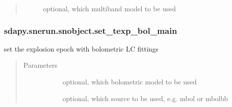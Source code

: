 \documentclass[letterpaper,10pt,english]{sphinxmanual}
\begin{document}
\begin{fulllineitems}
\begin{fulllineitems}
\begin{quote}
\begin{description}
\begin{description}
\item[{}] \leavevmode{[}\sphinxtitleref{str}{]}
optional, which multiband model to be used

\end{description}

\end{description}\end{quote}

\end{fulllineitems}



\subsubsection{sdapy.snerun.snobject.set\_texp\_bol\_main}
\label{\detokenize{generated/sdapy.snerun.snobject.set_texp_bol_main:sdapy-snerun-snobject-set-texp-bol-main}}\label{\detokenize{generated/sdapy.snerun.snobject.set_texp_bol_main::doc}}

\begin{fulllineitems}
\label{\detokenize{generated/sdapy.snerun.snobject.set_texp_bol_main:sdapy.snerun.snobject.set_texp_bol_main}}
set the explosion epoch with bolometric LC fittings
\begin{quote}\begin{description}
\item[{Parameters}] \leavevmode\begin{description}
\item[{}] \leavevmode{[}\sphinxtitleref{str}{]}
optional, which bolometric model to be used

\item[{}] \leavevmode{[}\sphinxtitleref{str}{]}
optional, which source to be used, e.g. mbol or mbolbb

\end{description}

\end{description}\end{quote}

\end{fulllineitems}




\end{fulllineitems}
\end{document}
